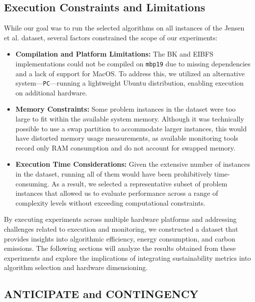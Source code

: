 \documentclass[a4paper,singleside,12pt]{report} %
\begin{document}
\subsection{Execution Constraints and Limitations}

While our goal was to run the selected algorithms on all instances of the Jensen et al. dataset, several factors constrained the scope of our experiments:

\begin{itemize}
    \item \textbf{Compilation and Platform Limitations:} The BK and EIBFS implementations could not be compiled on \verb|mbp19| due to missing dependencies and a lack of support for MacOS. 
    To address this, we utilized an alternative system—\verb|PC|—running a lightweight Ubuntu distribution, enabling execution on additional hardware.
    
    \item \textbf{Memory Constraints:} Some problem instances in the dataset were too large to fit within the available system memory. Although it was technically possible to use a swap 
    partition to accommodate larger instances, this would have distorted memory usage measurements, as available monitoring tools record only RAM consumption and do not account for swapped memory.
    
    \item \textbf{Execution Time Considerations:} Given the extensive number of instances in the dataset, running all of them would have been prohibitively time-consuming. As a result, we 
    selected a representative subset of problem instances that allowed us to evaluate performance across a range of complexity levels without exceeding computational constraints.
\end{itemize}

By executing experiments across multiple hardware platforms and addressing challenges related to execution and monitoring, we constructed a dataset that provides insights into algorithmic 
efficiency, energy consumption, and carbon emissions. The following sections will analyze the results obtained from these experiments and explore the implications of integrating sustainability
metrics into algorithm selection and hardware dimensioning.

\subsection{ANTICIPATE and CONTINGENCY}
\end{document}
